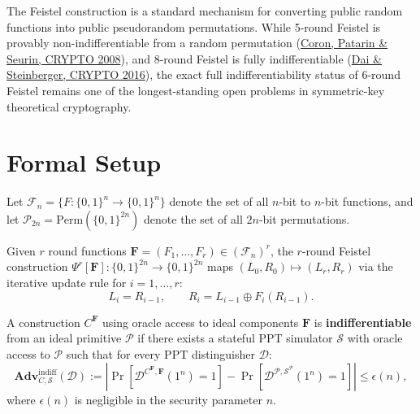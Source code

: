 \documentclass{conjura-conjecture}
\begin{document}

\vspace{0.4em}

The Feistel construction is a standard mechanism for converting public random functions into public pseudorandom permutations. While 5-round Feistel is provably non-indifferentiable from a random permutation (\href{https://eprint.iacr.org/2008/246}{Coron, Patarin \& Seurin, CRYPTO 2008}), and 8-round Feistel is fully indifferentiable (\href{https://eprint.iacr.org/2015/1069}{Dai \& Steinberger, CRYPTO 2016}), the exact full indifferentiability status of 6-round Feistel remains one of the longest-standing open problems in symmetric-key theoretical cryptography.

\section{Formal Setup}

Let $\mathcal{F}_n = \{F : \{0,1\}^n \to \{0,1\}^n\}$ denote the set of all $n$-bit to $n$-bit functions, and let $\mathcal{P}_{2n} = \mathrm{Perm}(\{0,1\}^{2n})$ denote the set of all $2n$-bit permutations.

\begin{definition}
Given $r$ round functions $\mathbf{F} = (F_1, \dots, F_r) \in (\mathcal{F}_n)^r$, the $r$-round Feistel construction $\Psi^r[\mathbf{F}] : \{0,1\}^{2n} \to \{0,1\}^{2n}$ maps $(L_0, R_0) \mapsto (L_r, R_r)$ via the iterative update rule for $i = 1, \dots, r$:
\begin{equation}
L_i = R_{i-1}, \qquad R_i = L_{i-1} \oplus F_i(R_{i-1}).
\end{equation}
\end{definition}

\begin{definition}
A construction $C^{\mathbf{F}}$ using oracle access to ideal components $\mathbf{F}$ is \textbf{indifferentiable} from an ideal primitive $\mathcal{P}$ if there exists a stateful PPT simulator $\mathcal{S}$ with oracle access to $\mathcal{P}$ such that for every PPT distinguisher $\mathcal{D}$:
\begin{equation}
\mathbf{Adv}_{C, \mathcal{S}}^{\mathrm{indiff}}(\mathcal{D}) := \left| \Pr\left[ \mathcal{D}^{C^{\mathbf{F}}, \mathbf{F}}(1^n) = 1 \right] - \Pr\left[ \mathcal{D}^{\mathcal{P}, \mathcal{S}^\mathcal{P}}(1^n) = 1 \right] \right| \le \epsilon(n),
\end{equation}
where $\epsilon(n)$ is negligible in the security parameter $n$.
\end{definition}
\end{document}
